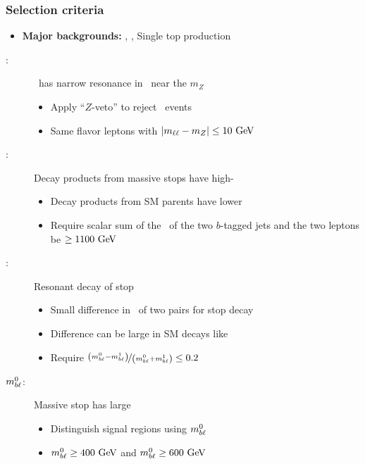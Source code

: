 \documentclass[10pt, svgnames]{beamer}
\begin{document}
\begin{frame}
  \frametitle{Selection criteria}
  \begin{itemize}
    \item \textbf{\color{nice_blue} Major backgrounds:} \TTBAR, \ZGAMMAJETS, Single top production
  \end{itemize}
  \vspace{1ex}
  \begin{description}
    \item[\MLL:] \ZJETS\ has narrow resonance in \MLL\ near the 
      $m_Z$
      \begin{itemize}
        \item Apply ``$Z$-veto'' to reject \ZJETS\ events
        \item Same flavor leptons with $|\MLL - m_Z| \leq 10 \GeV$
      \end{itemize}
    \item[\HT:] Decay products from massive stops have high-\pt
      \begin{itemize}
        \item Decay products from SM parents have lower \pt
        \item Require scalar sum of the \pt\ of the two $b$-tagged jets and
          the two leptons be $\geq 1100 \GeV$
      \end{itemize}
    \item[\MBLASYM:] Resonant decay of stop
      \begin{itemize}
        \item Small difference in \MBL\ of two pairs for stop decay
        \item Difference can be large in SM decays like \TTBAR
        \item Require
          $\nicefrac{\left(m_{b\ell}^0-m_{b\ell}^1\right)}{\left(m_{b\ell}^0+m_{b\ell}^1\right)}
          \leq 0.2$
      \end{itemize}
    \item[$m_{b\ell}^0$:] Massive stop has large \MBL
      \begin{itemize}
        \item Distinguish signal regions using $m_{b\ell}^0$
        \item $\MBL^0 \geq 400 \GeV$ and $\MBL^0 \geq 600 \GeV$
      \end{itemize}
  \end{description}
\end{frame}
\end{document}
